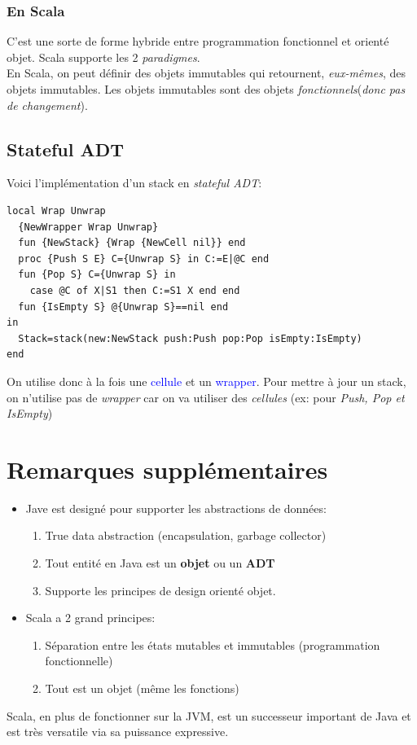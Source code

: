 \documentclass{report}
\begin{document}
\subsubsection{En Scala}
C'est une sorte de forme hybride entre programmation fonctionnel et orienté objet. Scala supporte les 2 \textit{paradigmes}.\\
En Scala, on peut définir des objets immutables qui retournent, \textit{eux-mêmes}, des objets immutables.  Les objets immutables sont des objets \textit{fonctionnels}(\textit{donc pas de changement}).

\subsection{Stateful ADT}
Voici l'implémentation d'un stack en \textit{stateful ADT}:
\begin{lstlisting}[escapechar=\%]
local Wrap Unwrap 
  {NewWrapper Wrap Unwrap} 
  fun {NewStack} {Wrap {NewCell nil}} end 
  proc {Push S E} C={Unwrap S} in C:=E|@C end 
  fun {Pop S} C={Unwrap S} in 
    case @C of X|S1 then C:=S1 X end end 
  fun {IsEmpty S} @{Unwrap S}==nil end
in 
  Stack=stack(new:NewStack push:Push pop:Pop isEmpty:IsEmpty)
end
\end{lstlisting}
On utilise donc à la fois une \textcolor{blue}{cellule} et un \textcolor{blue}{wrapper}. Pour mettre à jour un stack, on n'utilise pas de \textit{wrapper} car on va utiliser des \textit{cellules} (ex: pour \textit{Push, Pop et IsEmpty})

\section{Remarques supplémentaires}
\begin{itemize}
\item Jave est designé pour supporter les abstractions de données:
	\begin{enumerate}
	\item True data abstraction (encapsulation, garbage collector)
	\item Tout entité en Java est un \textbf{objet} ou un \textbf{ADT}
	\item Supporte les principes de design orienté objet.
	\end{enumerate}
\item Scala a 2 grand principes:
	\begin{enumerate}
	\item Séparation entre les états mutables et immutables (programmation fonctionnelle)
	\item Tout est un objet (même les fonctions)
	\end{enumerate}
\end{itemize}
Scala, en plus de fonctionner sur la JVM, est un successeur important de Java et est très versatile via sa puissance expressive.
\end{document}
